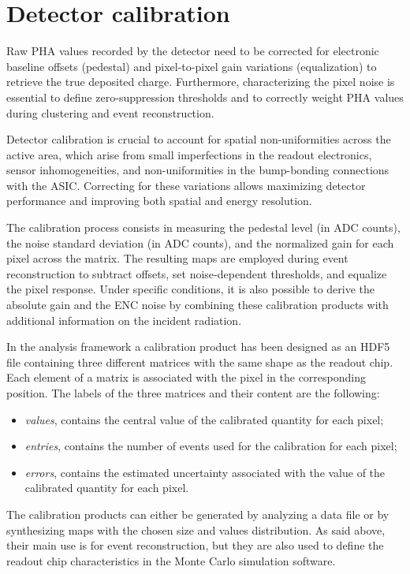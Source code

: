 \section{Detector calibration}
\label{sec:calibration}

Raw PHA values recorded by the detector need to be corrected for electronic baseline offsets (pedestal) and pixel-to-pixel gain variations (equalization) to retrieve the true deposited charge. Furthermore, characterizing the pixel noise is essential to define zero-suppression thresholds and to correctly weight PHA values during clustering and event reconstruction.

Detector calibration is crucial to account for spatial non-uniformities across the active area, which arise from small imperfections in the readout electronics, sensor inhomogeneities, and non-uniformities in the bump-bonding connections with the ASIC. Correcting for these variations allows maximizing detector performance and improving both spatial and energy resolution.

The calibration process consists in measuring the pedestal level (in ADC counts), the noise standard deviation (in ADC counts), and the normalized gain for each pixel across the matrix. The resulting maps are employed during event reconstruction to subtract offsets, set noise-dependent thresholds, and equalize the pixel response. Under specific conditions, it is also possible to derive the absolute gain and the ENC noise by combining these calibration products with additional information on the incident radiation.

In the analysis framework a calibration product has been designed as an HDF5 file containing three different matrices with the same shape as the readout chip. Each element of a matrix is associated with the pixel in the corresponding position. The labels of the three matrices and their content are the following:
\begin{itemize}[label=-]
\item \textit{values}, contains the central value of the calibrated quantity for each pixel;
\item \textit{entries}, contains the number of events used for the calibration for each pixel;
\item \textit{errors}, contains the estimated uncertainty associated with the value of the calibrated quantity for each pixel.
\end{itemize}

The calibration products can either be generated by analyzing a data file or by synthesizing maps with the chosen size and values distribution. As said above, their main use is for event reconstruction, but they are also used to define the readout chip characteristics in the Monte Carlo simulation software.

